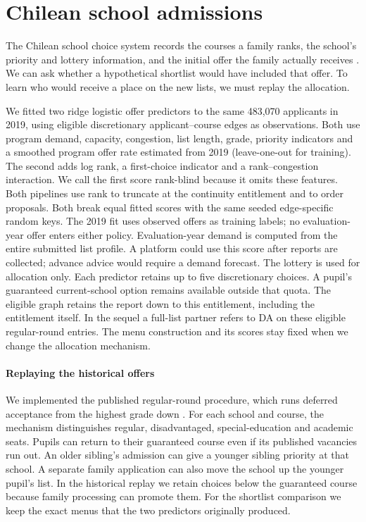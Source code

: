 \section{Chilean school admissions}\label{sec:chile}
The Chilean school choice system records the courses a family ranks, the school's priority and lottery information, and the initial offer the family actually receives \citep{saedata,correaschool}. We can ask whether a hypothetical shortlist would have included that offer. To learn who would receive a place on the new lists, we must replay the allocation.

We fitted two ridge logistic offer predictors to the same 483,070 applicants in 2019, using eligible discretionary applicant--course edges as observations. Both use program demand, capacity, congestion, list length, grade, priority indicators and a smoothed program offer rate estimated from 2019 (leave-one-out for training). The second adds log rank, a first-choice indicator and a rank--congestion interaction. We call the first score rank-blind because it omits these features. Both pipelines use rank to truncate at the continuity entitlement and to order proposals. Both break equal fitted scores with the same seeded edge-specific random keys. The 2019 fit uses observed offers as training labels; no evaluation-year offer enters either policy. Evaluation-year demand is computed from the entire submitted list profile. A platform could use this score after reports are collected; advance advice would require a demand forecast. The lottery is used for allocation only. Each predictor retains up to five discretionary choices. A pupil's guaranteed current-school option remains available outside that quota. The eligible graph retains the report down to this entitlement, including the entitlement itself. In the sequel a full-list partner refers to DA on these eligible regular-round entries. The menu construction and its scores stay fixed when we change the allocation mechanism.

\paragraph{Replaying the historical offers}
We implemented the published regular-round procedure, which runs deferred acceptance from the highest grade down \citep{correaschool,saedata,doganreserves}. For each school and course, the mechanism distinguishes regular, disadvantaged, special-education and academic seats. Pupils can return to their guaranteed course even if its published vacancies run out. An older sibling's admission can give a younger sibling priority at that school. A separate family application can also move the school up the younger pupil's list. In the historical replay we retain choices below the guaranteed course because family processing can promote them. For the shortlist comparison we keep the exact menus that the two predictors originally produced.

